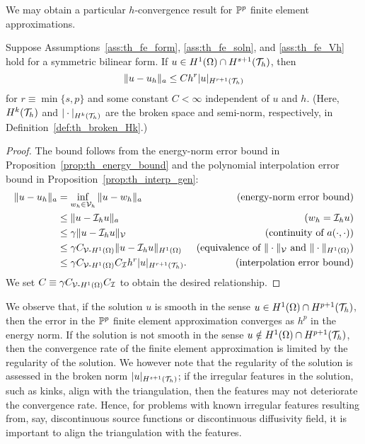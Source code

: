 We may obtain a particular $h$-convergence result for $\mathbb{P}^p$ finite element approximations.
\begin{proposition}
  \label{prop:th_energy_bound_poly}
  Suppose Assumptions~\ref{ass:th_fe_form}, \ref{ass:th_fe_soln}, and \ref{ass:th_fe_Vh} hold for a symmetric bilinear form. If $u \in H^1(\Omega) \cap H^{s+1}(\mathcal{T}_h)$, then
  \begin{equation*}
    \| u - u_h \|_a \leq C h^r | u |_{H^{r+1}(\mathcal{T}_h)}
  \end{equation*}
  for $r \equiv \min\{s,p\}$ and some constant $C < \infty$ independent of $u$ and $h$.  (Here, $H^k(\mathcal{T}_h)$ and $| \cdot |_{H^{k}(\mathcal{T}_h)}$ are the broken space and semi-norm, respectively, in Definition~\ref{def:th_broken_Hk}.)
  \begin{proof}
    The bound follows from the energy-norm error bound in Proposition~\eqref{prop:th_energy_bound} and the polynomial interpolation error bound in Proposition~\ref{prop:th_interp_gen}:
    \begin{align*}
      \| u - u_h \|_a &= \inf_{w_h \in \mathcal{V}_h} \| u - w_h \|_a
      & \text{(energy-norm error bound)}  \\
      &\leq \| u - \mathcal{I}_h u \|_a &\text{($w_h = \mathcal{I}_h u$)} \\
      &\leq \gamma \| u - \mathcal{I}_h u \|_{\mathcal{V}} &\text{(continuity of $a(\cdot,\cdot)$)} \\
      &\leq \gamma C_{\mathcal{V}\text{-}H^1(\Omega)} \| u - \mathcal{I}_h u \|_{H^1(\Omega)} &\text{(equivalence of $\| \cdot \|_{\mathcal{V}}$ and $\|\cdot \|_{H^1(\Omega)}$)} \\
      &\leq \gamma C_{\mathcal{V}\text{-}H^1(\Omega)} C_{\mathcal{I}} h^r | u |_{H^{r+1}(\mathcal{T}_h)}. &\text{(interpolation error bound)}
    \end{align*}
    We set $C \equiv \gamma C_{\mathcal{V}\text{-}H^1(\Omega)} C_{\mathcal{I}}$ to obtain the desired relationship.
  \end{proof}
\end{proposition}

We observe that, if the solution $u$ is smooth in the sense $u \in H^1(\Omega) \cap H^{p+1}(\mathcal{T}_h)$, then the error in the $\mathbb{P}^p$ finite element approximation converges as $h^p$ in the energy norm.  If the solution is not smooth in the sense $u \notin H^1(\Omega) \cap H^{p+1}(\mathcal{T}_h)$, then the convergence rate of the finite element approximation is limited by the regularity of the solution.  We however note that the regularity of the solution is assessed in the broken norm $| u |_{H^{s+1}(\mathcal{T}_h)}$; if the irregular features in the solution, such as kinks, align with the triangulation, then the features may not deteriorate the convergence rate.  Hence, for problems with known irregular features resulting from, say, discontinuous source functions or discontinuous diffusivity field, it is important to align the triangulation with the features.


